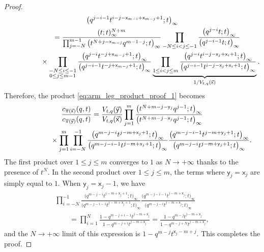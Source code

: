 \begin{proof}
\begin{gather*}
		{\big(q^{j-i-1}t^{i-j-\mathsf{x}_{m-i}+\mathsf{x}_{m-j}+1};t\big)_{\infty}}
		\\
\hphantom{c_{\overline\pi(\vec{\mathsf{x}})}(q,t)}{}
		=
		\frac{(t;t)_{\infty}^{N+m}}
		{
			\prod_{j=-N}^{m-1}
			\big(t^{N+j-\mathsf{x}_{m-j}}q^{m-1-j};t\big)_{\infty}
		}
		\prod_{-N\le i<j\le -1}
		\frac{\big(q^{j-i}t;t\big)_{\infty}}
		{\big(q^{j-i-1}t;t\big)_{\infty}}
		\\
\hphantom{c_{\overline\pi(\vec{\mathsf{x}})}(q,t)=}{}
\times
		\prod_{\substack{-N\le i\le -1 \\ 0\le j\le m-1}}
		\frac{\big(q^{j-i}t^{-j+\mathsf{x}_{m-j}+1};t\big)_{\infty}}
		{\big(q^{j-i-1}t^{-j+\mathsf{x}_{m-j}+1};t\big)_{\infty}}
		\underbrace{
		\prod_{1\le i<j\le m}
		\frac{\big(q^{j-i}t^{i-j-\mathsf{x}_{j}+\mathsf{x}_{i}+1};t\big)_{\infty}}
		{\big(q^{j-i-1}t^{i-j-\mathsf{x}_{j}+\mathsf{x}_{i}+1};t\big)_{\infty}}}
		_{1/V_{t,q}(\vec{\mathsf{x}})}.
	\end{gather*}
	Therefore,
	the product \eqref{eq:arm_leg_product_proof_1}
	becomes
	\begin{gather*}
		\frac{c_{\overline\pi(\vec{\mathsf{x}})}(q,t)}
		{c_{\overline\pi(\vec{\mathsf{y}})}(q,t)}
		=
		\frac{V_{t,q}(\vec{\mathsf{y}})}
		{V_{t,q}(\vec{\mathsf{x}})}
			\prod_{j=1}^{m}
		\frac{
			\big(t^{N+m-j-\mathsf{y}_{j}}q^{j-1};t\big)_{\infty}
		}
		{
			\big(t^{N+m-j-\mathsf{x}_{j}}q^{j-1};t\big)_{\infty}
		}\\
\hphantom{\frac{c_{\overline\pi(\vec{\mathsf{x}})}(q,t)}
		{c_{\overline\pi(\vec{\mathsf{y}})}(q,t)}=}{}
\times
		\prod_{j=1}^{m}
		\prod_{i=-N}^{-1}
		\frac{\big(q^{m-j-i}t^{j-m+\mathsf{x}_{j}+1};t\big)_{\infty}}
		{\big(q^{m-j-i-1}t^{j-m+\mathsf{x}_{j}+1};t\big)_{\infty}}
		\frac
		{\big(q^{m-j-i-1}t^{j-m+\mathsf{y}_{j}+1};t\big)_{\infty}}
		{\big(q^{m-j-i}t^{j-m+\mathsf{y}_{j}+1};t\big)_{\infty}}.
	\end{gather*}
	The first product over $1\le j\le m$
	converges to $1$ as $N\to+\infty$
	thanks to the presence of $t^N$.
	In the second product over $1\le j\le m$, the terms
	where $\mathsf{y}_j=\mathsf{x}_j$ are simply equal to $1$.
	When $\mathsf{y}_j=\mathsf{x}_j-1$, we have
	\begin{gather*}
		\prod_{i=-N}^{-1}
		\frac{\big(q^{m-j-i}t^{j-m+\mathsf{x}_{j}+1};t\big)_{\infty}}
		{\big(q^{m-j-i-1}t^{j-m+\mathsf{x}_{j}+1};t\big)_{\infty}}
		\frac
		{\big(q^{m-j-i-1}t^{j-m+\mathsf{x}_{j}};t\big)_{\infty}}
		{\big(q^{m-j-i}t^{j-m+\mathsf{x}_{j}};t\big)_{\infty}}
	\\
\qquad{}	 =
		\prod_{i=1}^{N}
		\frac{1-q^{m-j+i-1}t^{j-m+\mathsf{x}_{j}}}
		{1-q^{m-j+i}t^{j-m+\mathsf{x}_{j}}}
	 =
		\frac{1-q^{m-j}t^{j-m+\mathsf{x}_{j}}}
		{1-q^{m-j+N}t^{j-m+\mathsf{x}_{j}}},
	\end{gather*}
	and the $N\to+\infty$ limit of this expression is
	$1-q^{m-j}t^{\mathsf{x}_{j}-m+j}$.
	This completes the proof.
\end{proof}

